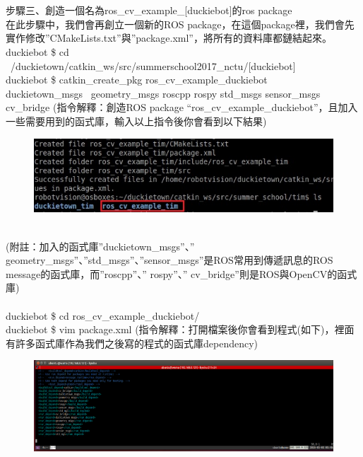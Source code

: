 \documentclass{article}
\begin{document}
\\\\步驟三、創造一個名為ros\_cv\_example\_[duckiebot]的ros package
\\在此步驟中，我們會再創立一個新的ROS package，在這個package裡，我們會先實作修改”CMakeLists.txt”與”package.xml”，將所有的資料庫都鏈結起來。
\\duckiebot \$ cd ~/duckietown/catkin\_ws/src/summerschool2017\_nctu/[duckiebot]
\\duckiebot \$ catkin\_create\_pkg ros\_cv\_example\_duckiebot 
\\duckietown\_msgs  geometry\_msgs roscpp rospy std\_msgs sensor\_msgs cv\_bridge
(指令解釋：創造ROS package “ros\_cv\_example\_duckiebot”，且加入一些需要用到的函式庫，輸入以上指令後你會看到以下結果)
\begin{figure}[htp]
    \begin{center}
        \includegraphics[width=400pt]{pic/5_2_4.png}
    \end{center}
\end{figure}
\\
(附註：加入的函式庫”duckietown\_msgs”、” geometry\_msgs”、”std\_msgs”、”sensor\_msgs”是ROS常用到傳遞訊息的ROS message的函式庫，而”roscpp”、” rospy”、” cv\_bridge”則是ROS與OpenCV的函式庫)
\\\\duckiebot \$ cd ros\_cv\_example\_duckiebot/
\\duckiebot \$ vim package.xml
(指令解釋：打開檔案後你會看到程式(如下)，裡面有許多函式庫作為我們之後寫的程式的函式庫dependency)
\begin{figure}[htp]
    \begin{center}
        \includegraphics[width=400pt]{pic/5_2_5.png}
    \end{center}
\end{figure}
\end{document}
